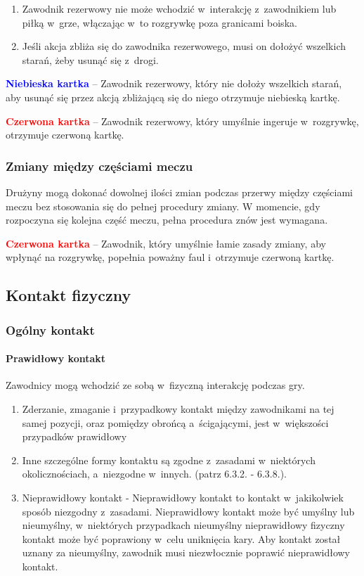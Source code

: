 \documentclass[12pt,a4paper]{article}
\newcommand\redcard[1]{\bgroup\textcolor{red}{\textbf{#1}}}
\newcommand\bluecard[1]{\bgroup\textcolor{blue}{\textbf{#1}}}
\begin{document}
\begin{enumerate}
	\item
	      Zawodnik rezerwowy nie może wchodzić w~interakcję z~zawodnikiem lub
	      piłką w~grze, włączając w~to rozgrywkę poza granicami boiska.
	\item
	      Jeśli akcja zbliża się do zawodnika rezerwowego, musi on dołożyć
	      wszelkich starań, żeby usunąć się z~drogi.
\end{enumerate}

\bluecard{Niebieska kartka} -- Zawodnik rezerwowy, który nie dołoży wszelkich
starań, aby usunąć się przez akcją zbliżającą się do niego otrzymuje
niebieską kartkę.

\redcard{Czerwona kartka} -- Zawodnik rezerwowy, który umyślnie ingeruje w~rozgrywkę, otrzymuje czerwoną kartkę.

\subsubsection{Zmiany między częściami meczu}

Drużyny mogą dokonać dowolnej ilości zmian podczas przerwy między
częściami meczu bez stosowania się do pełnej procedury zmiany. W
momencie, gdy rozpoczyna się kolejna część meczu, pełna procedura znów
jest wymagana.

\redcard{Czerwona kartka} -- Zawodnik, który umyślnie łamie zasady zmiany,
aby wpłynąć na rozgrywkę, popełnia poważny faul i~otrzymuje czerwoną
kartkę.

\subsection{Kontakt fizyczny}

\subsubsection{Ogólny kontakt}

\paragraph{Prawidłowy kontakt}
Zawodnicy mogą wchodzić
ze sobą w~fizyczną interakcję podczas gry.

\begin{enumerate}
	\item
	      Zderzanie, zmaganie i~przypadkowy kontakt między zawodnikami na tej
	      samej pozycji, oraz pomiędzy obrońcą a~ścigającymi, jest w~większości
	      przypadków prawidłowy
	\item
	      Inne szczególne formy kontaktu są zgodne z~zasadami w~niektórych
	      okolicznościach, a~niezgodne w~innych. (patrz 6.3.2. - 6.3.8.).
	\item
	      Nieprawidłowy kontakt - Nieprawidłowy kontakt to kontakt w~jakikolwiek
	      sposób niezgodny z~zasadami. Nieprawidłowy kontakt może być umyślny
	      lub nieumyślny, w~niektórych przypadkach nieumyślny nieprawidłowy
	      fizyczny kontakt może być poprawiony w~celu uniknięcia kary. Aby
	      kontakt został uznany za nieumyślny, zawodnik musi niezwłocznie
	      poprawić nieprawidłowy kontakt.
\end{enumerate}
\end{document}
